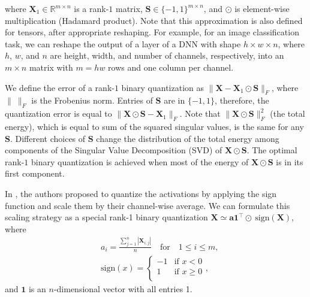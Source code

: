 \documentclass[10pt,twocolumn,letterpaper]{article}
\def\eva{{a}}
\def\va{{\bm{a}}}
\def\mX{{\bm{X}}}
\def\mS{{\bm{S}}}
\newcommand{\R}{\mathbb{R}}
\begin{document}
where $\mX_1 \in \R^{m \times n}$ is a rank-$1$ matrix, $\mS \in \{-1,1\}^{m \times n}$, and $\odot$ is element-wise multiplication (Hadamard product). Note that this approximation is also defined for tensors, after appropriate reshaping. For example, for an image classification task, we can reshape the output of a layer of a DNN with shape $h\times w \times n$, where $h$, $w$, and $n$ are height, width, and number of channels, respectively, into an $m \times n$ matrix with $m=hw$ rows and one column per channel.

We define the error of a rank-$1$ binary quantization as $\| \mX - \mX_1 \odot \mS \|_F$, where $\|~\|_F$ is the Frobenius norm. Entries of $\mS$ are in $\{-1,1\}$, therefore, the quantization error is equal to $\| \mX \odot \mS - \mX_1 \|_F$. Note that $\| \mX \odot \mS \|_F^2$ (the total energy), which is equal to sum of the squared singular values, is the same for any $\mS$. Different choices of $\mS$ change the distribution of the total energy among components of the Singular Value Decomposition (SVD) of $\mX \odot \mS$. The optimal rank-$1$ binary quantization is achieved when most of the energy of $\mX \odot \mS$ is in its first component.

In \cite{rastegari2016xnor}, the authors proposed to quantize the activations by applying the sign function and scale them by their channel-wise average. We can formulate this scaling strategy as a special rank-1 binary quantization $\mX \simeq \va \boldsymbol{1}^{\top} \odot ~\text{sign}(\mX)$, where
\begin{equation}
 \begin{aligned}
&\eva_i = \frac{\sum_{j=1}^n |\mX_{i,j}|}{n} \quad \text{for} \quad 1\le i \le m \text{,} \\
&\text{sign}(x) = \begin{cases}
-1 & \text{if $x<0$}\\
1 & \text{if $x \ge 0$}\\
\end{cases},
\end{aligned}
\end{equation}
and $\boldsymbol{1}$ is an $n$-dimensional vector with all entries 1.
\end{document}
